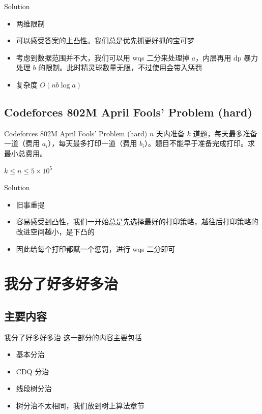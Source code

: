 ﻿\documentclass[aspectratio=169,handout]{ctexbeamer}
\begin{document}
\begin{frame}{Solution}
    \begin{itemize}
        \item 两维限制
        \item 可以感受答案的上凸性。我们总是优先抓更好抓的宝可梦
        \item 考虑到数据范围并不大，我们可以用 wqs 二分来处理掉 $a$，内层再用 dp 暴力处理 $b$ 的限制。此时精灵球数量无限，不过使用会带入惩罚
        \item 复杂度 $O(nb\log a)$
    \end{itemize}
\end{frame}

\subsection{Codeforces 802M April Fools' Problem (hard)}
\begin{frame}{Codeforces 802M April Fools' Problem (hard)}
    $n$ 天内准备 $k$ 道题，每天最多准备一道（费用 $a_i$），每天最多打印一道（费用 $b_i$）。题目不能早于准备完成打印。求最小总费用。
    
    $k\le n\le 5\times10^5$
\end{frame}

\begin{frame}{Solution}
    \begin{itemize}
        \item 旧事重提
        \item 容易感受到凸性，我们一开始总是先选择最好的打印策略，越往后打印策略的改进空间越小，是下凸的
        \item 因此给每个打印都赋一个惩罚，进行 wqs 二分即可
    \end{itemize}
\end{frame}




\section{我分了好多好多治}

\subsection{主要内容}

\begin{frame}{我分了好多好多治}
    这一部分的内容主要包括
    \begin{itemize}
        \item 基本分治
        \item CDQ 分治
        \item 线段树分治
        \item 树分治不太相同，我们放到树上算法章节
    \end{itemize}
\end{frame}
\end{document}
